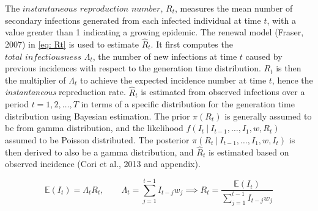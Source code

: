 \documentclass[12pt]{article}
\begin{document}
      The $\textit{instantaneous reproduction number}$, $R_t$, measures the mean number of secondary infections generated from each
      infected individual at time $t$, 
      with a value greater than 1 indicating a growing epidemic. The renewal model (Fraser, 2007) 
      in \cref{eq: Rt} is used to estimate $\hat{R}_t$. 
      It first computes the $\textit{total infectiousness } \Lambda_t$, 
      the number of new infections at time $t$ caused by previous incidences with respect to the generation time distribution. 
      $R_t$ is then the multiplier of $\Lambda_t$ to achieve the expected incidence number at time $t$, hence the 
      \textit{instantaneous} repreduction rate. 
      $\hat{R}_t$ is estimated from observed infections over a period $t = 1,2,\dots,T$ in terms of a specific distribution for 
      the generation time distribution using Bayesian estimation. The prior $\pi(R_t)$ is generally assumed to be from
      gamma distribution, and the likelihood $f(I_t \ | \ I_{t-1},\dots,I_1, w, R_t)$ assumed to be Poisson distributed. 
      The posterior $\pi(R_t \ | \ I_{t-1},\dots,I_1, w, I_t)$ is then derived to also be a gamma distribution, 
      and $\hat{R}_t$ is estimated based on observed incidence (Cori et al., 2013 and appendix).

      \begin{equation} \label{eq: Rt}
        \mathbb{E}(I_t) = \Lambda_t R_t, \qquad \Lambda_t = \sum_{j = 1}^{t - 1} I_{t - j} w_j \implies R_t =
         \frac{\mathbb{E}(I_t)}{\sum_{j = 1}^{t - 1} I_{t - j} w_j}
      \end{equation}
\end{document}

